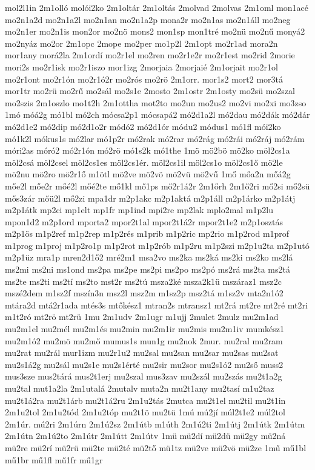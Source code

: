 {mol2l1in
2m1olló
molói2ko
2m1oltár
2m1oltás
2molvad
2molvas
2m1oml
mon1acé
mo2n1a2d
mo2n1a2l
mo2n1an
mo2n1a2p
mona2r
mo2n1as
mo2n1áll
mo2neg
mo2n1er
mo2n1is
mon2or
mo2nö
mons2
mon1sp
mon1tré
mo2nü
mo2nű
monyá2
mo2nyáz
mo2or
2m1opc
2mope
mo2per
mo1p2l
2m1opt
mo2r1ad
mora2n
mor1any
morá2la
2m1ordí
mo2r1el
mo2ren
mo2r1e2r
mo2r1est
mo2rid
2morie
mori2s
mo2r1isk
mo2r1iszo
mor1izg
2morjaia
2morjaié
2m1orjait
mo2r1ol
mo2r1ont
mo2r1ón
mo2r1ó2r
mo2rós
mo2rö
2m1orr.
mor1s2
mort2
mor3tá
mor1tr
mo2rü
mo2rű
mo2sál
mo2s1e
2mosto
2m1ostr
2m1osty
mo2sü
mo2szal
mo2szis
2m1oszlo
mo1t2h
2m1ottha
mot2to
mo2un
mo2us2
mo2vi
mo2xi
mo3zso
1mó
móá2g
mó1bl
mó2ch
mócsa2p1
mócsapá2
mó2d1a2l
mó2dau
mó2dák
mó2dár
mó2d1e2
mó2dip
mó2d1o2r
módó2
mó2d1ór
módu2
módus1
mó1fl
mói2ko
mó1k2l
mókus1s
mó2lar
mó1p2r
mó2rak
mó2rar
mó2rág
mó2rái
mó2ráj
mó2rám
móri2as
móró2
mó2r1ón
mó2rö
mó1s2k
mó1the
1mö
mö2bö
mö2ko
möl2cs1a
möl2csá
möl2csel
möl2cs1es
möl2cs1ér.
möl2cs1il
möl2cs1o
möl2cs1ő
mö2le
mö2nu
mö2ro
mö2r1ő
m1ötl
mö2ve
mö2vö
mö2vü
mö2vű
1mő
mőa2n
mőá2g
mőe2l
mőe2r
mőé2l
mőé2te
mő1kl
mő1ps
mő2r1á2r
2m1őrh
2m1ő2ri
mő2si
mő2sü
mős3zár
mőü2l
mő2zi
mpa1dr
m2p1akc
m2p1aktá
m2p1áll
m2p1árko
m2p1átj
m2p1átk
mp2ci
mp1elt
mp1fr
mp1ind
mpi2re
mp2lak
mplo2mal
m1p2lu
mpon1d2
m2p1ord
mporta2
mpor2t1al
mpor2t1á2r
mpor2t1e2
m2p1osztás
m2p1ös
m1p2ref
m1p2rep
m1p2rés
m1prib
m1p2ric
mp2rio
m1p2rod
m1prof
m1prog
m1proj
m1p2ro1p
m1p2rot
m1p2rób
m1p2ru
m1p2szi
m2p1u2ta
m2p1utó
m2p1üz
mra1p
mren2d1ő2
mré2m1
msa2vo
ms2ka
ms2ká
ms2ki
ms2ko
ms2lá
ms2mi
ms2ni
ms1ond
ms2pa
ms2pe
ms2pi
ms2po
ms2pó
ms2rá
ms2ta
ms2tá
ms2te
ms2ti
ms2tí
ms2to
mst2r
ms2tú
msza2ké
msza2k1ü
mszáraz1
msz2c
mszé2dem
m1sz2f
mszín3n
msz2l
msz2m
m1sz2p
msz2tá
m1sz2v
mta2n1ó2
mtára2d
mtá2r1ada
mtés3s
mtőkész1
mtran2s
mtransz1
mt2rá
mt2re
mt2ré
mt2ri
m1t2ró
mt2rö
mt2rü
1mu
2m1udv
2m1ugr
m1ujj
2mulet
2mulz
mu2m1ad
mu2m1el
mu2mél
mu2m1és
mu2min
mu2m1ir
mu2mis
mu2m1iv
mumkész1
mu2m1ó2
mu2mö
mu2mő
mumus1s
mun1g
mu2nok
2mur.
mu2ral
mu2ram
mu2rat
mu2rál
mur1izm
mu2r1u2
mu2sal
mu2san
mu2sar
mu2sas
mu2sat
mu2s1á2g
mu2sál
mu2s1e
mu2s1érté
mu2sir
mu2sor
mu2s1ó2
mu2ső
muss2
mus3sze
mus2tárá
mus2t1erj
mu2szal
mus3zav
mu2szál
mu2szás
mu2t1a2g
mu2tal
mut1a2la
2m1utalá
2mutalv
muta2n
mu2t1any
mu2tasí
m1u2taz
mu2t1á2ra
mu2t1árb
mu2t1á2ru
2m1u2tás
2mutca
mu2t1el
mu2til
mu2t1in
2m1u2tol
2m1u2tód
2m1u2tóp
mu2t1ö
mu2tü
1mú
mú2jí
múl2t1e2
múl2tol
2m1úr.
mú2ri
2m1úrn
2m1ú2sz
2m1útb
m1úth
2m1ú2ti
2m1útj
2m1útk
2m1útm
2m1útn
2m1ú2to
2m1útr
2m1útt
2m1útv
1mü
mü2dí
mü2dü
mü2gy
mü2ná
mü2re
mü2rí
mü2rü
mü2te
mü2té
mü2tő
mü1tz
mü2ve
mü2vö
mü2ze
1mű
mű1bl
mű1br
mű1fl
mű1fr
mű1gr
}
